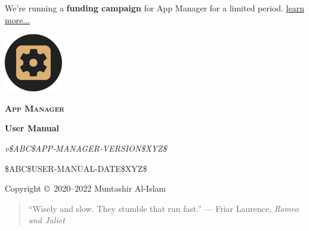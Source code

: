 \begin{titlingpage}
    \pagecolor{SunTan}
    \begin{center}
        \begin{announcement}
        We're running a \textbf{funding campaign} for App Manager for a limited period. \href{https://opencollective.com/app-manager#category-ABOUT}{learn more...}
        \end{announcement}
        \includegraphics[width=1in]{../images/icon}\par\vspace{1cm}
        {\Huge\textbf{\textsc{App Manager}}\par}
        \vspace{2.5cm}
        {\huge\bfseries User Manual\par}
        \vspace{.5cm}
        {\Large\itshape v\$ABC\$APP-MANAGER-VERSION\$XYZ\$\par}
        \vfill
        {\large \$ABC\$USER-MANUAL-DATE\$XYZ\$\par}
        \vfill
        {Copyright \copyright\ 2020--2022 Muntashir Al-Islam\par}
        \pagebreak
        \pagecolor{white}
        \begin{quotation}
            ``Wisely and slow. They stumble that run fast.''
                {--- Friar Laurence, \textit{Romeo and Juliet}}
        \end{quotation}
    \end{center}
\end{titlingpage}
